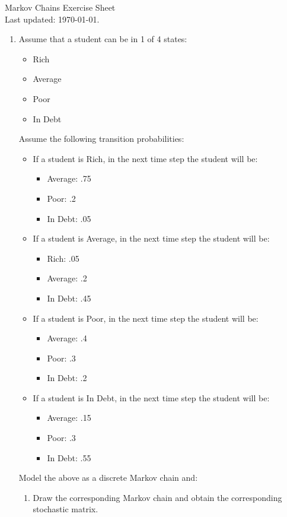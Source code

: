 \documentclass[12pt]{article}
\begin{document}
\begin{center}
\Huge{Markov Chains Exercise Sheet}\\
\tiny{Last updated: \today.}
\end{center}

\begin{enumerate}
\item Assume that a student can be in 1 of 4 states:
\begin{itemize}
	\item Rich
	\item Average
	\item Poor
	\item In Debt
\end{itemize}
Assume the following transition probabilities:

\begin{itemize}
	\item If a student is Rich, in the next time step the student will be:
	\begin{itemize}
		\item Average: .75
		\item Poor: .2
		\item In Debt: .05
	\end{itemize}
	\item If a student is Average, in the next time step the student will be:
	\begin{itemize}
		\item Rich: .05
		\item Average: .2
		\item In Debt: .45
	\end{itemize}
	\item If a student is Poor, in the next time step the student will be:
	\begin{itemize}
		\item Average: .4
		\item Poor: .3
		\item In Debt: .2
	\end{itemize}
	\item If a student is In Debt, in the next time step the student will be:
	\begin{itemize}
		\item Average: .15
		\item Poor: .3
		\item In Debt: .55
	\end{itemize}
\end{itemize}Model the above as a discrete Markov chain and:
\begin{enumerate}
	\item Draw the corresponding Markov chain and obtain the corresponding stochastic matrix.


\end{enumerate}
\end{enumerate}
\end{document}

